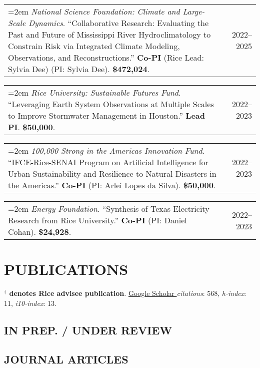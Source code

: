 \documentclass[10pt,oneside]{article}
\makeatletter
\newenvironment{alignedentrieshang}[1][2em]{%
  \noindent%
}{%
}
\newcommand{\hangingitem}[2]{%
  \noindent%
  \begin{tabular*}{\textwidth}{@{}p{0.85\textwidth}@{\extracolsep{\fill}}r@{}}%
    \hangindent=2em \hangafter=1 #1 & #2%
  \end{tabular*}%
}
\makeatother
\begin{document}
\begin{alignedentrieshang}
\hangingitem{\textit{National Science Foundation}\textit{: Climate and Large-Scale Dynamics}. ``Collaborative Research: Evaluating the Past and Future of Mississippi River Hydroclimatology to Constrain Risk via Integrated Climate Modeling, Observations, and Reconstructions.'' \textbf{Co-PI} (Rice Lead: Sylvia Dee) (PI: Sylvia Dee). \textbf{\$472,024}.}{2022--2025}

\hangingitem{\textit{Rice University}\textit{: Sustainable Futures Fund}. ``Leveraging Earth System Observations at Multiple Scales to Improve Stormwater Management in Houston.'' \textbf{Lead PI}. \textbf{\$50,000}.}{2022--2023}

\hangingitem{\textit{100,000 Strong in the Americas Innovation Fund}. ``IFCE-Rice-SENAI Program on Artificial Intelligence for Urban Sustainability and Resilience to Natural Disasters in the Americas.'' \textbf{Co-PI} (PI: Arlei Lopes da Silva). \textbf{\$50,000}.}{2022--2023}

\hangingitem{\textit{Energy Foundation}. ``Synthesis of Texas Electricity Research from Rice University.'' \textbf{Co-PI} (PI: Daniel Cohan). \textbf{\$24,928}.}{2022--2023}

\end{alignedentrieshang}


\section{PUBLICATIONS}

{\textcolor{RiceBlue}{\textbf{$^\mathbf{\dagger}$ denotes Rice advisee publication}}}.
\href{https://scholar.google.com/citations?user=6ifLBBsAAAAJ}{Google Scholar \aiGoogleScholar} \textit{citations}: 568, \textit{h-index}: 11, \textit{i10-index}: 13.
\medskip


\subsection{IN PREP. / UNDER REVIEW}

\printbibliography[filter=ispreprint, heading=none, env=hanging]

\subsection{JOURNAL ARTICLES}

\printbibliography[heading=none, type=article, env=hanging]
\end{document}

